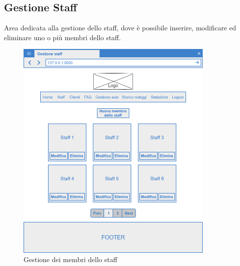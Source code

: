 \documentclass[12pt,a4paperS]{report}
\begin{document}
\begin{normalsize}
			\subsection{Gestione Staff}
				Area dedicata alla gestione dello staff, dove è possibile inserire, modificare ed eliminare uno o più membri dello staff.
				\begin{figure}[H]
					\centering
					\includegraphics[width=0.86\textwidth, height=0.86\textheight, keepaspectratio]{Mockup/Gestione_staff.png}
					\caption{Gestione dei membri dello staff}
				\end{figure}
			

\end{normalsize}
\end{document}
